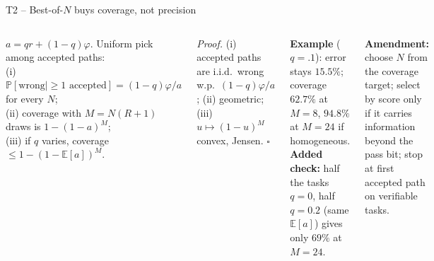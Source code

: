 \documentclass[aspectratio=169,10pt]{beamer}
\renewcommand{\Pr}{\mathbb{P}}
\newcommand{\E}{\mathbb{E}}
\begin{document}
\begin{frame}{T2 -- Best-of-$N$ buys coverage, not precision}
\begin{columns}[T]
\begin{theorem}[T2]\small
$a=qr+(1-q)\varphi$. Uniform pick among accepted paths:\\
(i) $\Pr[\text{wrong}\mid\ge1\text{ accepted}]=(1-q)\varphi/a$ for every $N$;\\
(ii) coverage with $M=N(R{+}1)$ draws is $1-(1-a)^M$;\\
(iii) if $q$ varies, coverage $\le 1-(1-\E[a])^M$.
\end{theorem}
\small\textit{Proof.} (i) accepted paths are i.i.d.\ wrong w.p.\ $(1-q)\varphi/a$; (ii) geometric; (iii) $u\mapsto(1-u)^M$ convex, Jensen. $\square$

\textbf{Example} ($q{=}.1$): error stays $15.5\%$; coverage $62.7\%$ at $M{=}8$, $94.8\%$ at $M{=}24$ if homogeneous.\\
\textbf{Added check:} half the tasks $q{=}0$, half $q{=}0.2$ (same $\E[a]$) gives only $69\%$ at $M{=}24$.

\scriptsize\textbf{Amendment:} choose $N$ from the coverage target; select by score only if it carries information beyond the pass bit; stop at first accepted path on verifiable tasks.
\end{columns}
\end{frame}
\end{document}
